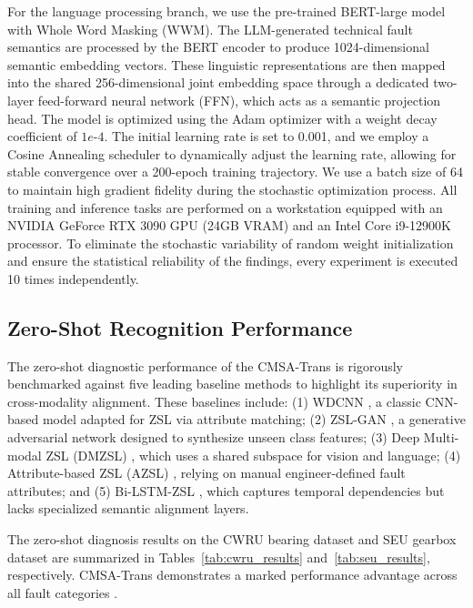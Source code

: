 \documentclass[journal]{IEEEtran}
\begin{document}
For the language processing branch, we use the pre-trained BERT-large model with Whole Word Masking (WWM). The LLM-generated technical fault semantics are processed by the BERT encoder to produce 1024-dimensional semantic embedding vectors. These linguistic representations are then mapped into the shared 256-dimensional joint embedding space through a dedicated two-layer feed-forward neural network (FFN), which acts as a semantic projection head. The model is optimized using the Adam optimizer with a weight decay coefficient of $1e$-$4$. The initial learning rate is set to 0.001, and we employ a Cosine Annealing scheduler to dynamically adjust the learning rate, allowing for stable convergence over a 200-epoch training trajectory. We use a batch size of 64 to maintain high gradient fidelity during the stochastic optimization process. All training and inference tasks are performed on a workstation equipped with an NVIDIA GeForce RTX 3090 GPU (24GB VRAM) and an Intel Core i9-12900K processor. To eliminate the stochastic variability of random weight initialization and ensure the statistical reliability of the findings, every experiment is executed 10 times independently.

\subsection{Zero-Shot Recognition Performance}

The zero-shot diagnostic performance of the CMSA-Trans is rigorously benchmarked against five leading baseline methods to highlight its superiority in cross-modality alignment. These baselines include: (1) WDCNN \cite{zhang2017new}, a classic CNN-based model adapted for ZSL via attribute matching; (2) ZSL-GAN \cite{xian2019fvaegan}, a generative adversarial network designed to synthesize unseen class features; (3) Deep Multi-modal ZSL (DMZSL) \cite{schonfeld2019generalized}, which uses a shared subspace for vision and language; (4) Attribute-based ZSL (AZSL) \cite{lampert2014attribute}, relying on manual engineer-defined fault attributes; and (5) Bi-LSTM-ZSL \cite{chen2019bearing}, which captures temporal dependencies but lacks specialized semantic alignment layers.

The zero-shot diagnosis results on the CWRU bearing dataset and SEU gearbox dataset are summarized in Tables~\ref{tab:cwru_results} and~\ref{tab:seu_results}, respectively. CMSA-Trans demonstrates a marked performance advantage across all fault categories \cite{li2022zero, lu2017deep}.
\end{document}
